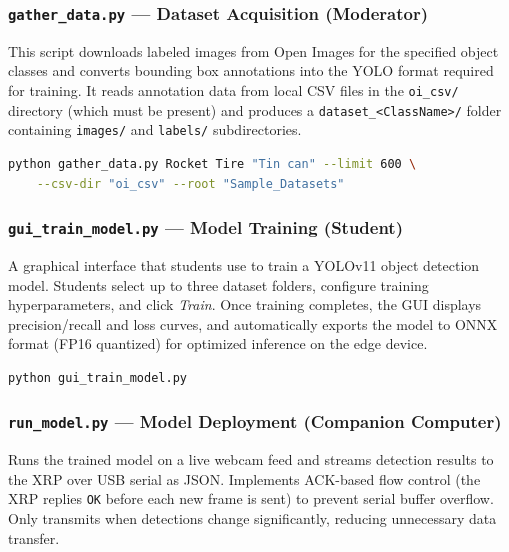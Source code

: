 \documentclass[11pt,a4paper]{article}
\begin{document}
\subsubsection*{\texttt{gather\_data.py} — Dataset Acquisition (Moderator)}

This script downloads labeled images from Open Images for the specified object classes and converts bounding box annotations into the YOLO format required for training. It reads annotation data from local CSV files in the \texttt{oi\_csv/} directory (which must be present) and produces a \texttt{dataset\_<ClassName>/} folder containing \texttt{images/} and \texttt{labels/} subdirectories.

\begin{lstlisting}[language=bash, caption={Gathering datasets for the three challenge classes}]
python gather_data.py Rocket Tire "Tin can" --limit 600 \
    --csv-dir "oi_csv" --root "Sample_Datasets"
\end{lstlisting}

\subsubsection*{\texttt{gui\_train\_model.py} — Model Training (Student)}

A graphical interface that students use to train a YOLOv11 object detection model. Students select up to three dataset folders, configure training hyperparameters, and click \textit{Train}. Once training completes, the GUI displays precision/recall and loss curves, and automatically exports the model to ONNX format (FP16 quantized) for optimized inference on the edge device.

\begin{lstlisting}[language=bash, caption={Launching the training GUI}]
python gui_train_model.py
\end{lstlisting}

\subsubsection*{\texttt{run\_model.py} — Model Deployment (Companion Computer)}

Runs the trained model on a live webcam feed and streams detection results to the XRP over USB serial as JSON. Implements ACK-based flow control (the XRP replies \texttt{OK} before each new frame is sent) to prevent serial buffer overflow. Only transmits when detections change significantly, reducing unnecessary data transfer.
\end{document}
